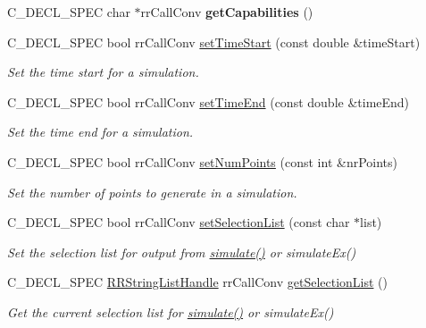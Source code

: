 \begin{DoxyCompactItemize}
\item 
\hypertarget{group__loadsave_gaecce7b3dda3548fbe579922aadf25610}{
\-C\-\_\-\-D\-E\-C\-L\-\_\-\-S\-P\-E\-C char $\ast$rr\-Call\-Conv {\bfseries get\-Capabilities} ()}
\label{group__loadsave_gaecce7b3dda3548fbe579922aadf25610}

\item 
\-C\-\_\-\-D\-E\-C\-L\-\_\-\-S\-P\-E\-C bool rr\-Call\-Conv \hyperlink{group__loadsave_ga1a636a76ad610d99fe1c780bb3d9296d}{set\-Time\-Start} (const double \&time\-Start)
\begin{DoxyCompactList}\small\item\em \-Set the time start for a simulation. \end{DoxyCompactList}\item 
\-C\-\_\-\-D\-E\-C\-L\-\_\-\-S\-P\-E\-C bool rr\-Call\-Conv \hyperlink{group__loadsave_ga1313e21d622cd846bdd75071e965eb6c}{set\-Time\-End} (const double \&time\-End)
\begin{DoxyCompactList}\small\item\em \-Set the time end for a simulation. \end{DoxyCompactList}\item 
\-C\-\_\-\-D\-E\-C\-L\-\_\-\-S\-P\-E\-C bool rr\-Call\-Conv \hyperlink{group__loadsave_ga448ead53bb8913de664cc8ad675b4197}{set\-Num\-Points} (const int \&nr\-Points)
\begin{DoxyCompactList}\small\item\em \-Set the number of points to generate in a simulation. \end{DoxyCompactList}\item 
\-C\-\_\-\-D\-E\-C\-L\-\_\-\-S\-P\-E\-C bool rr\-Call\-Conv \hyperlink{group__loadsave_ga6465c94b6dfed39a6ef614bd0a68cb9b}{set\-Selection\-List} (const char $\ast$list)
\begin{DoxyCompactList}\small\item\em \-Set the selection list for output from \hyperlink{group__simulation_ga9f0555c11716daec2336d54d13facc57}{simulate()} or simulate\-Ex() \end{DoxyCompactList}\item 
\-C\-\_\-\-D\-E\-C\-L\-\_\-\-S\-P\-E\-C \hyperlink{struct_r_r_string_list}{\-R\-R\-String\-List\-Handle} \*
rr\-Call\-Conv \hyperlink{group__loadsave_ga1db0b86ed7fd0d6e19f8df85b7577253}{get\-Selection\-List} ()
\begin{DoxyCompactList}\small\item\em \-Get the current selection list for \hyperlink{group__simulation_ga9f0555c11716daec2336d54d13facc57}{simulate()} or simulate\-Ex() \end{DoxyCompactList}\item 

\end{DoxyCompactItemize}
